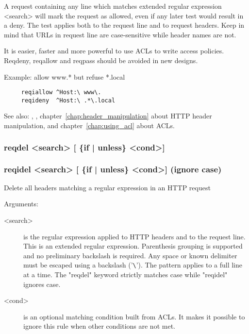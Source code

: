   A request containing any line which matches extended regular expression
  <search> will mark the request as allowed, even if any later test would
  result in a deny. The test applies both to the request line and to request
  headers. Keep in mind that URLs in request line are case-sensitive while
  header names are not.

  It is easier, faster and more powerful to use ACLs to write access policies.
  Reqdeny, reqallow and reqpass should be avoided in new designs.

  Example: allow www.* but refuse *.local
\begin{verbatim}
     reqiallow ^Host:\ www\.
     reqideny  ^Host:\ .*\.local
\end{verbatim}


See also: , , chapter~\ref{chap:header_manipulation} about HTTP header manipulation, and
            chapter~\ref{chap:using_acl} about ACLs.

\subsubsection[reqdel]{reqdel  <search> [ \{if | unless\} <cond>]}
\subsubsection[reqidel]{reqidel <search> [ \{if | unless\} <cond>]  (ignore case)}


  Delete all headers matching a regular expression in an HTTP request


  Arguments:

\begin{description}
\item[<search>]  is the regular expression applied to HTTP headers and to the
              request line. This is an extended regular expression. Parenthesis
              grouping is supported and no preliminary backslash is required.
              Any space or known delimiter must be escaped using a backslash
              ('\verb|\|'). The pattern applies to a full line at a time. The "reqdel"
              keyword strictly matches case while "reqidel" ignores case.

\item[<cond>] is an optional matching condition built from ACLs. It makes it
              possible to ignore this rule when other conditions are not met.
\end{description}


